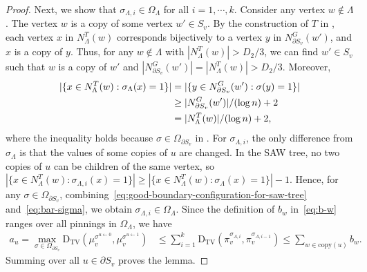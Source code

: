 \documentclass[11pt]{amsart}
\def\-#1{\mathrm{#1}}
\newcommand{\DTV}[2]{\-D_{\mathrm{TV}}\left({#1},{#2}\right)}
\newcommand{\nbd}[2]{N_{#1}^{#2}}
\theoremstyle{definition}
\theoremstyle{remark}
\begin{document}
\begin{proof}
Next, we show that $\sigma_{\Lambda,i} \in \Omega_{\Lambda}$ for all $i = 1,\cdots,k$. 
Consider any vertex $w\notin \Lambda$. The vertex $w$ is a copy of some vertex $w'\in S_v$. 
By the construction of $T$ in , each vertex $x$ in $\nbd{\Lambda}{T}(w)$ corresponds bijectively to a vertex $y$ in $\nbd{\partial S_v}{G}(w')$, and $x$ is a copy of $y$.
Thus, for any $w\notin \Lambda$ with $|\nbd{\Lambda}{T}(w)|>D_2/3$, we can find $w'\in S_v$ such that $w$ is a copy of $w'$ and $|\nbd{\partial S_v}{G}(w')|=|\nbd{\Lambda}{T}(w)|>D_2/3$. Moreover,
\begin{align}\label{eq:bar-sigma}
    |\{x\in \nbd{\Lambda}{T}(w): \sigma_{\Lambda}(x) = 1\}| &= |\{y\in \nbd{\partial S_v}{G}(w'): \sigma(y) = 1\}| \notag\\
    &\geq |\nbd{\partial S_v}{G}(w')|/(\log n) + 2 \notag\\
    &= |\nbd{\Lambda}{T}(w)|/(\log n) + 2,
\end{align}
where the inequality holds because $\sigma \in \Omega_{\partial S_v}$ in .
For $\sigma_{\Lambda,i}$, the only difference from $\sigma_\Lambda$ is that the values of some copies of $u$ are changed. 
In the SAW tree, no two copies of $u$ can be children of the same vertex, so
$|\{x\in \nbd{\Lambda}{T}(w): \sigma_{\Lambda,i}(x) = 1\}|\geq |\{x\in \nbd{\Lambda}{T}(w): \sigma_{\Lambda}(x) = 1\}|-1$.
Hence, for any $\sigma \in \Omega_{\partial S_v}$, combining~\eqref{eq:good-boundary-configuration-for-saw-tree} and~\eqref{eq:bar-sigma}, we obtain $\sigma_{\Lambda,i} \in \Omega_{\Lambda}$. Since the definition of $b_w$ in~\eqref{eq:b-w} ranges over all pinnings in $\Omega_{\Lambda}$, we have
\begin{align*}
    a_u=\max_{\sigma \in \Omega_{\partial S_v}} \DTV{\mu^{\sigma^{u \gets 0}}_v}{\mu^{\sigma^{u \gets 1}}_v} &\leq \sum_{i=1}^k \DTV{\pi^{\sigma_{\Lambda,i}}_v}{\pi^{\sigma_{\Lambda,i-1}}_v} \leq \sum_{w\in \text{copy}(u)}b_w.
\end{align*}
Summing over all $u \in \partial S_v$ proves the lemma.
\end{proof}



\end{document}
